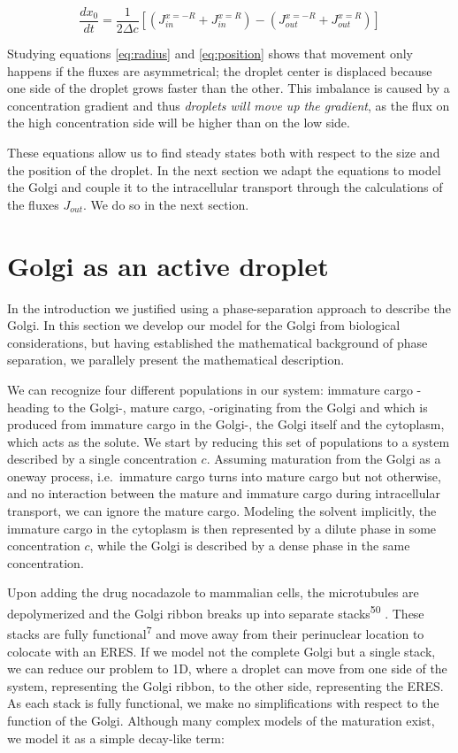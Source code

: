 \documentclass{Dissertate}
\begin{document}
\[
\frac{dx_0}{dt}=\frac{1}{2\Delta c}\left[(J_{in}^{x=-R}+J_{in}^{x=R})-(J_{out}^{x=-R}+J_{out}^{x=R})\right]
\]

Studying equations \ref{eq:radius} and \ref{eq:position} shows
that movement only happens if the fluxes are asymmetrical; the droplet
center is displaced because one side of the droplet grows faster than
the other. This imbalance is caused by a concentration gradient and thus
\emph{droplets will move up the gradient}, as the flux on the high
concentration side will be higher than on the low side.

These equations allow us to find steady states both with respect to the
size and the position of the droplet. In the next section we adapt the
equations to model the Golgi and couple it to the intracellular
transport through the calculations of the fluxes \(J_{out}\). We do so
in the next section.

\hypertarget{Golgi-as-an-active-droplet}{%
\section{Golgi as an active droplet}\label{Golgi-as-an-active-droplet}}

In the introduction we justified using a phase-separation approach to
describe the Golgi. In this section we develop our model for the Golgi
from biological considerations, but having established the mathematical
background of phase separation, we parallely present the mathematical
description.

We can recognize four different populations in our system: immature
cargo -heading to the Golgi-, mature cargo, -originating from the Golgi
and which is produced from immature cargo in the Golgi-, the Golgi
itself and the cytoplasm, which acts as the solute. We start by reducing
this set of populations to a system described by a single concentration
\(c\). Assuming maturation from the Golgi as a oneway process,
i.e.~immature cargo turns into mature cargo but not otherwise, and no
interaction between the mature and immature cargo during intracellular
transport, we can ignore the mature cargo. Modeling the solvent
implicitly, the immature cargo in the cytoplasm is then represented by a
dilute phase in some concentration \(c\), while the Golgi is described
by a dense phase in the same concentration.

Upon adding the drug nocadazole to mammalian cells, the microtubules are
depolymerized and the Golgi ribbon breaks up into separate
stacks\textsuperscript{50} . These stacks are fully
functional\textsuperscript{7} and move away from their perinuclear
location to colocate with an ERES. If we model not the complete Golgi
but a single stack, we can reduce our problem to 1D, where a droplet can
move from one side of the system, representing the Golgi ribbon, to the
other side, representing the ERES. As each stack is fully functional, we
make no simplifications with respect to the function of the Golgi.
Although many complex models of the maturation exist, we model it as a
simple decay-like term:
\end{document}
